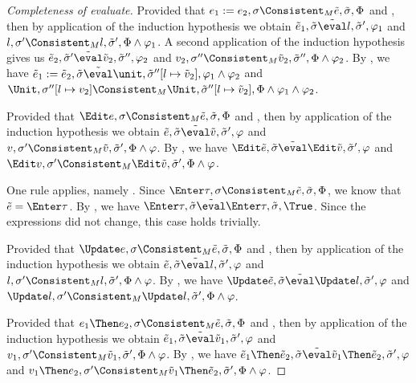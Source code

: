 \begin{proof}[Completeness of evaluate]
    {
    Provided that $e_1:= e_2,\sigma\Consistent_M \tilde{e},\tilde{\sigma},\Phi$ and ,
    then by application of the induction hypothesis we obtain $\tilde{e}_1,\tilde{\sigma}\tilde{\eval}l,\tilde{\sigma}',\phi_1$
    and $l,\sigma'\Consistent_M l,\tilde{\sigma}',\Phi\land\phi_1$.
    A second application of the induction hypothesis gives us  $\tilde{e}_2,\tilde{\sigma}'\tilde{\eval}\tilde{v}_2,\tilde{\sigma}'',\phi_2$
    and $v_2,\sigma''\Consistent_M \tilde{v}_2,\tilde{\sigma}'',\Phi\land\phi_2$.
    By , we have $\tilde{e}_1 := \tilde{e}_2,\tilde{\sigma}\tilde{\eval}\unit,\tilde{\sigma}''[l\mapsto\tilde{v}_2],\phi_1\land\phi_2$ and $\Unit,\sigma''[l\mapsto v_2]\Consistent_M \Unit,\tilde{\sigma}''[l\mapsto\tilde{v}_2],\Phi\land\phi_1\land\phi_2$.
    }

    {
    Provided that $\Edit e,\sigma\Consistent_M \tilde{e},\tilde{\sigma},\Phi$ and ,
    then by application of the induction hypothesis we obtain $\tilde{e},\tilde{\sigma}\tilde{\eval}\tilde{v},\tilde{\sigma}',\phi$
    and $v,\sigma'\Consistent_M \tilde{v},\tilde{\sigma}',\Phi\land\phi$.
    By , we have $\Edit\tilde{e},\tilde{\sigma}\tilde{\eval}\Edit\tilde{v},\tilde{\sigma}',\phi$ and $\Edit v,\sigma'\Consistent_M \Edit \tilde{v},\tilde{\sigma}',\Phi\land\phi$.

    }

    {
    One rule applies, namely .
    Since $\Enter \tau,\sigma\Consistent_M \tilde{e},\tilde{\sigma},\Phi$, we know that $\tilde{e}=\Enter \tau$.
    By , we have $\Enter \tau,\tilde{\sigma}\tilde{\eval}\Enter \tau,\tilde{\sigma},\True$.
    Since the expressions did not change, this case holds trivially.
    }

    {Provided that $\Update e,\sigma\Consistent_M \tilde{e},\tilde{\sigma},\Phi$ and ,
    then by application of the induction hypothesis we obtain $\tilde{e},\tilde{\sigma}\tilde{\eval}l,\tilde{\sigma}',\phi$
    and $l,\sigma'\Consistent_M l,\tilde{\sigma}',\Phi\land\phi$.
    By , we have $\Update\tilde{e},\tilde{\sigma}\tilde{\eval}\Update l,\tilde{\sigma}',\phi$ and $\Update l,\sigma'\Consistent_M \Update l ,\tilde{\sigma}',\Phi\land\phi$.

    }

    {
    Provided that $e_1\Then e_2,\sigma\Consistent_M \tilde{e},\tilde{\sigma},\Phi$ and ,
    then by application of the induction hypothesis we obtain $\tilde{e}_1,\tilde{\sigma}\tilde{\eval}\tilde{v}_1,\tilde{\sigma}',\phi$
    and $v_1,\sigma'\Consistent_M \tilde{v}_1,\tilde{\sigma}',\Phi\land\phi$.
    By , we have $\tilde{e}_1\Then \tilde{e}_2,\tilde{\sigma}\tilde{\eval}\tilde{v}_1\Then\tilde{e}_2,\tilde{\sigma}',\phi$ and $v_1\Then e_2 ,\sigma'\Consistent_M \tilde{v}_1\Then\tilde{e}_2 ,\tilde{\sigma}',\Phi\land\phi$.

}
\end{proof}
